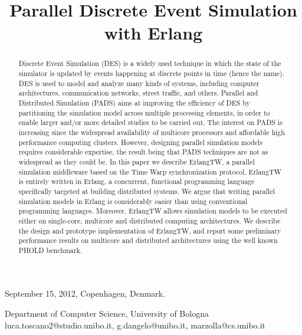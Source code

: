 \documentclass{sigplanconf}
\begin{document}
 {September 15, 2012, Copenhagen, Denmark.}

\title{Parallel Discrete Event Simulation with Erlang\footnotemark}

           {Department of Computer Science, University of Bologna}
           {luca.toscano2@studio.unibo.it, g.dangelo@unibo.it, marzolla@cs.unibo.it}

\maketitle


\begin{abstract}
  Discrete Event Simulation (DES) is a widely used technique in which
  the state of the simulator is updated by events happening at
  discrete points in time (hence the name). DES is used to model and
  analyze many kinds of systems, including computer architectures,
  communication networks, street traffic, and others.  Parallel and
  Distributed Simulation (PADS) aims at improving the efficiency of
  DES by partitioning the simulation model across multiple processing
  elements, in order to enable larger and/or more detailed studies to
  be carried out. The interest on PADS is increasing since the
  widespread availability of multicore processors and affordable high
  performance computing clusters. However, designing parallel
  simulation models requires considerable expertise, the result being
  that PADS techniques are not as widespread as they could be.  In
  this paper we describe ErlangTW, a parallel simulation middleware
  based on the Time Warp synchronization protocol. ErlangTW is
  entirely written in Erlang, a concurrent, functional programming
  language specifically targeted at building distributed systems. We
  argue that writing parallel simulation models in Erlang is
  considerably easier than using conventional programming languages.
  Moreover, ErlangTW allows simulation models to be executed either on
  single-core, multicore and distributed computing architectures. We
  describe the design and prototype implementation of ErlangTW, and
  report some preliminary performance results on multicore and
  distributed architectures using the well known PHOLD benchmark.
\end{abstract}
\end{document}
